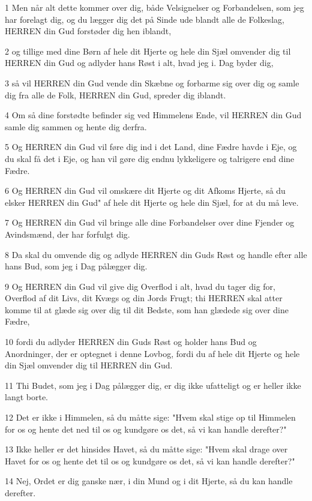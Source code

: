 \par 1 Men når alt dette kommer over dig, både Velsignelser og Forbandelsen, som jeg har forelagt dig, og du lægger dig det på Sinde ude blandt alle de Folkeslag, HERREN din Gud forstøder dig hen iblandt,
\par 2 og tillige med dine Børn af hele dit Hjerte og hele din Sjæl omvender dig til HERREN din Gud og adlyder hans Røst i alt, hvad jeg i. Dag byder dig,
\par 3 så vil HERREN din Gud vende din Skæbne og forbarme sig over dig og samle dig fra alle de Folk, HERREN din Gud, spreder dig iblandt.
\par 4 Om så dine forstødte befinder sig ved Himmelens Ende, vil HERREN din Gud samle dig sammen og hente dig derfra.
\par 5 Og HERREN din Gud vil føre dig ind i det Land, dine Fædre havde i Eje, og du skal få det i Eje, og han vil gøre dig endnu lykkeligere og talrigere end dine Fædre.
\par 6 Og HERREN din Gud vil omskære dit Hjerte og dit Afkoms Hjerte, så du elsker HERREN din Gud" af hele dit Hjerte og hele din Sjæl, for at du må leve.
\par 7 Og HERREN din Gud vil bringe alle dine Forbandelser over dine Fjender og Avindsmænd, der har forfulgt dig.
\par 8 Da skal du omvende dig og adlyde HERREN din Guds Røst og handle efter alle hans Bud, som jeg i Dag pålægger dig.
\par 9 Og HERREN din Gud vil give dig Overflod i alt, hvad du tager dig for, Overflod af dit Livs, dit Kvægs og din Jords Frugt; thi HERREN skal atter komme til at glæde sig over dig til dit Bedste, som han glædede sig over dine Fædre,
\par 10 fordi du adlyder HERREN din Guds Røst og holder hans Bud og Anordninger, der er optegnet i denne Lovbog, fordi du af hele dit Hjerte og hele din Sjæl omvender dig til HERREN din Gud.
\par 11 Thi Budet, som jeg i Dag pålægger dig, er dig ikke ufatteligt og er heller ikke langt borte.
\par 12 Det er ikke i Himmelen, så du måtte sige: "Hvem skal stige op til Himmelen for os og hente det ned til os og kundgøre os det, så vi kan handle derefter?"
\par 13 Ikke heller er det hinsides Havet, så du måtte sige: "Hvem skal drage over Havet for os og hente det til os og kundgøre os det, så vi kan handle derefter?"
\par 14 Nej, Ordet er dig ganske nær, i din Mund og i dit Hjerte, så du kan handle derefter.
